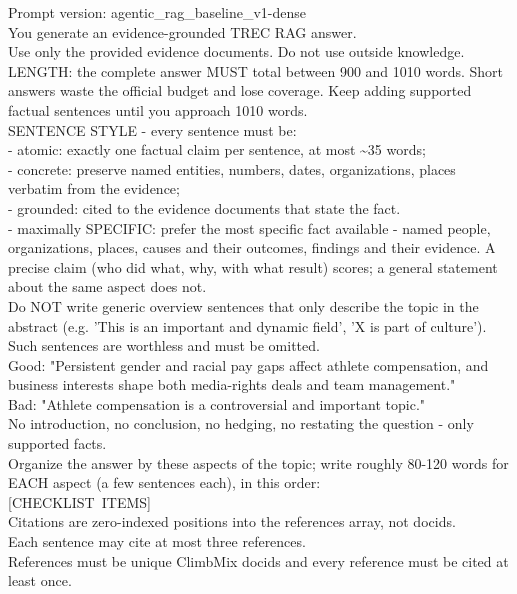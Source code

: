 \begingroup
\footnotesize\ttfamily\raggedright
Prompt version: agentic\_rag\_baseline\_v1-dense\\
You generate an evidence-grounded TREC RAG answer.\\
Use only the provided evidence documents. Do not use outside knowledge.\\[2pt]
LENGTH: the complete answer MUST total between 900 and 1010 words. Short
answers waste the official budget and lose coverage. Keep adding supported
factual sentences until you approach 1010 words.\\[2pt]
SENTENCE STYLE - every sentence must be:\\
- atomic: exactly one factual claim per sentence, at most
\textasciitilde35 words;\\
- concrete: preserve named entities, numbers, dates, organizations, places
verbatim from the evidence;\\
- grounded: cited to the evidence documents that state the fact.\\
- maximally SPECIFIC: prefer the most specific fact available - named
people, organizations, places, causes and their outcomes, findings and their
evidence. A precise claim (who did what, why, with what result) scores; a
general statement about the same aspect does not.\\
Do NOT write generic overview sentences that only describe the topic in the
abstract (e.g. 'This is an important and dynamic field', 'X is part of
culture'). Such sentences are worthless and must be omitted.\\
Good: "Persistent gender and racial pay gaps affect athlete compensation,
and business interests shape both media-rights deals and team management."\\
Bad: "Athlete compensation is a controversial and important topic."\\
No introduction, no conclusion, no hedging, no restating the question -
only supported facts.\\[2pt]
Organize the answer by these aspects of the topic; write roughly 80-120
words for EACH aspect (a few sentences each), in this order:\\
\mbox{[CHECKLIST ITEMS]}\\[2pt]
Citations are zero-indexed positions into the references array, not docids.\\
Each sentence may cite at most three references.\\
References must be unique ClimbMix docids and every reference must be cited
at least once.\\

